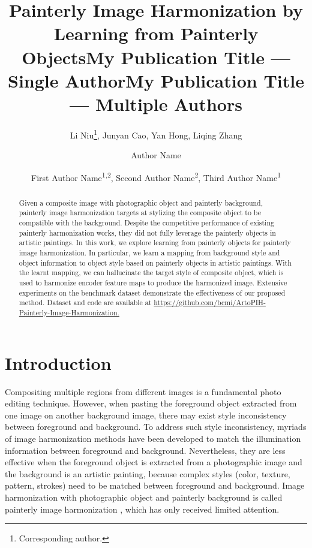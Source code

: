 \documentclass[letterpaper]{article} %
\title{Painterly Image Harmonization by Learning from Painterly Objects}
\author{
    Li Niu\thanks{Corresponding author.},
    Junyan Cao,
    Yan Hong,
    Liqing Zhang
    \\
}
\title{My Publication Title --- Single Author}
\author {
    Author Name
}
\title{My Publication Title --- Multiple Authors}
\author {
    First Author Name\textsuperscript{\rm 1,\rm 2},
    Second Author Name\textsuperscript{\rm 2},
    Third Author Name\textsuperscript{\rm 1}
}
\begin{document}
\maketitle

\begin{abstract}
Given a composite image with photographic object and painterly background, painterly image harmonization targets at stylizing the composite object to be compatible with the background. Despite the competitive performance of existing painterly harmonization works, they did not fully leverage the painterly objects in artistic paintings. In this work, we explore learning from painterly objects for painterly image harmonization. In particular, we learn a mapping from background style and object information to object style based on painterly objects in artistic paintings. With the learnt mapping, we can hallucinate the target style of composite object, which is used to harmonize encoder feature maps to produce the harmonized image. Extensive experiments on the benchmark dataset demonstrate the effectiveness of our proposed method. Dataset and code are available at \url{https://github.com/bcmi/ArtoPIH-Painterly-Image-Harmonization.}
\end{abstract}

\section{Introduction}


Compositing multiple regions from different images is a fundamental photo editing technique. However, when pasting the foreground object extracted from one image on another background image, there may exist style inconsistency between foreground and background. To address such style inconsistency, myriads of image harmonization methods \cite{tsai2017deep,cong2020dovenet,ling2021region} have been developed to match the illumination information between foreground and background.
Nevertheless, they are less effective when the foreground object is extracted from a photographic image and the background is an artistic painting, because complex styles (color, texture, pattern, strokes) need to be matched between foreground and background.
Image harmonization with photographic object and painterly background is called painterly image harmonization \cite{luan2018deep}, which has only received limited attention.
\end{document}
